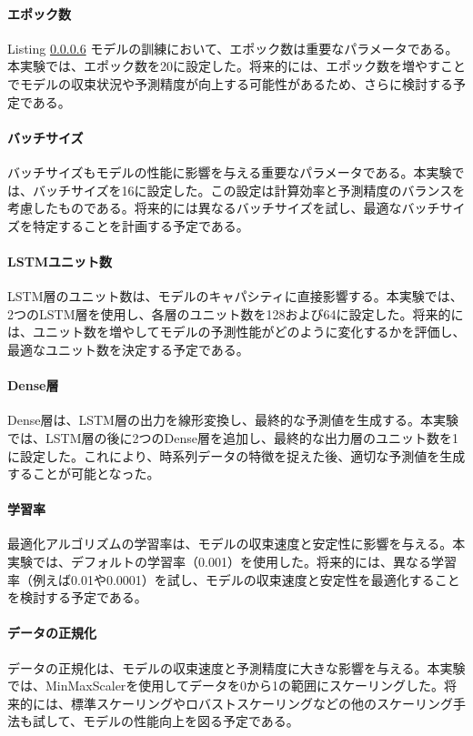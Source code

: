 \documentclass[a4paper, 11pt, titlepage]{jsarticle}
\begin{document}
\paragraph{エポック数}
\indent Listing \ref{}
\indent モデルの訓練において、エポック数は重要なパラメータである。本実験では、エポック数を20に設定した。将来的には、エポック数を増やすことでモデルの収束状況や予測精度が向上する可能性があるため、さらに検討する予定である。

\paragraph{バッチサイズ}
\indent バッチサイズもモデルの性能に影響を与える重要なパラメータである。本実験では、バッチサイズを16に設定した。この設定は計算効率と予測精度のバランスを考慮したものである。将来的には異なるバッチサイズを試し、最適なバッチサイズを特定することを計画する予定である。

\paragraph{LSTMユニット数}
\indent LSTM層のユニット数は、モデルのキャパシティに直接影響する。本実験では、2つのLSTM層を使用し、各層のユニット数を128および64に設定した。将来的には、ユニット数を増やしてモデルの予測性能がどのように変化するかを評価し、最適なユニット数を決定する予定である。

\paragraph{Dense層}
\indent Dense層は、LSTM層の出力を線形変換し、最終的な予測値を生成する。本実験では、LSTM層の後に2つのDense層を追加し、最終的な出力層のユニット数を1に設定した。これにより、時系列データの特徴を捉えた後、適切な予測値を生成することが可能となった。

\paragraph{学習率}
\indent 最適化アルゴリズムの学習率は、モデルの収束速度と安定性に影響を与える。本実験では、デフォルトの学習率（0.001）を使用した。将来的には、異なる学習率（例えば0.01や0.0001）を試し、モデルの収束速度と安定性を最適化することを検討する予定である。

\paragraph{データの正規化}
\indent データの正規化は、モデルの収束速度と予測精度に大きな影響を与える。本実験では、MinMaxScalerを使用してデータを0から1の範囲にスケーリングした。将来的には、標準スケーリングやロバストスケーリングなどの他のスケーリング手法も試して、モデルの性能向上を図る予定である。
\end{document}
